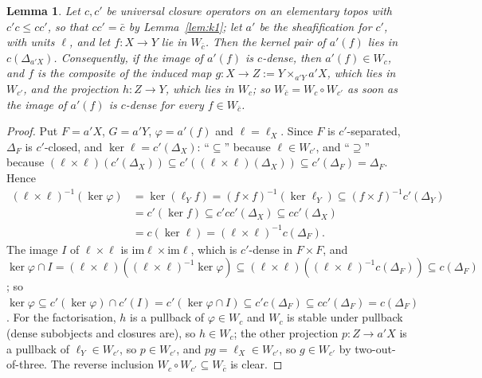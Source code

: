 \documentclass[11pt]{amsart}
\newtheorem{lem}[thm]{Lemma}
\theoremstyle{definition}
\newcommand{\im}{\mathrm{im}}
\begin{document}
\begin{lem}\label{lem:kp}
Let $c,c'$ be universal closure operators on an elementary topos with
$c'c\le cc'$, so that $cc'=\bar c$ by Lemma~\ref{lem:k1}; let $a'$ be the
sheafification for $c'$, with units $\ell$, and let $f\colon X\to Y$ lie
in $W_{\bar c}$. Then the kernel pair of $a'(f)$ lies in $c(\Delta_{a'X})$.
Consequently, if the image of $a'(f)$ is $c$-dense, then $a'(f)\in W_c$,
and $f$ is the composite of the induced map $g\colon X\to Z:=Y\times_{a'Y}
a'X$, which lies in $W_{c'}$, and the projection $h\colon Z\to Y$, which
lies in $W_c$; so $W_{\bar c}=W_c\circ W_{c'}$ as soon as the image of
$a'(f)$ is $c$-dense for every $f\in W_{\bar c}$.
\end{lem}
\begin{proof}
Put $F=a'X$, $G=a'Y$, $\varphi=a'(f)$ and $\ell=\ell_X$. Since $F$ is
$c'$-separated, $\Delta_F$ is $c'$-closed, and $\ker\ell=c'(\Delta_X)$:
``$\subseteq$'' because $\ell\in W_{c'}$, and ``$\supseteq$'' because
$(\ell\times\ell)(c'(\Delta_X))\subseteq c'((\ell\times\ell)(\Delta_X))
\subseteq c'(\Delta_F)=\Delta_F$. Hence
\begin{align*}
(\ell\times\ell)^{-1}(\ker\varphi)&=\ker(\ell_Yf)=(f\times f)^{-1}(\ker\ell_Y)
\subseteq(f\times f)^{-1}c'(\Delta_Y)\\
&=c'(\ker f)\subseteq c'cc'(\Delta_X)\subseteq cc'(\Delta_X)\\
&=c(\ker\ell)=(\ell\times\ell)^{-1}c(\Delta_F).
\end{align*}
The image $I$ of $\ell\times\ell$ is $\im\ell\times\im\ell$, which is
$c'$-dense in $F\times F$, and $\ker\varphi\cap I=(\ell\times\ell)
((\ell\times\ell)^{-1}\ker\varphi)\subseteq(\ell\times\ell)((\ell\times\ell)^{-1}
c(\Delta_F))\subseteq c(\Delta_F)$; so
$\ker\varphi\subseteq c'(\ker\varphi)\cap c'(I)=c'(\ker\varphi\cap I)
\subseteq c'c(\Delta_F)\subseteq cc'(\Delta_F)=c(\Delta_F)$. For the
factorisation, $h$ is a pullback of $\varphi\in W_c$ and $W_c$ is stable
under pullback (dense subobjects and closures are), so $h\in W_c$; the
other projection $p\colon Z\to a'X$ is a pullback of $\ell_Y\in W_{c'}$, so
$p\in W_{c'}$, and $pg=\ell_X\in W_{c'}$, so $g\in W_{c'}$ by
two-out-of-three. The reverse inclusion $W_c\circ W_{c'}\subseteq W_{\bar
c}$ is clear.
\end{proof}
\end{document}

